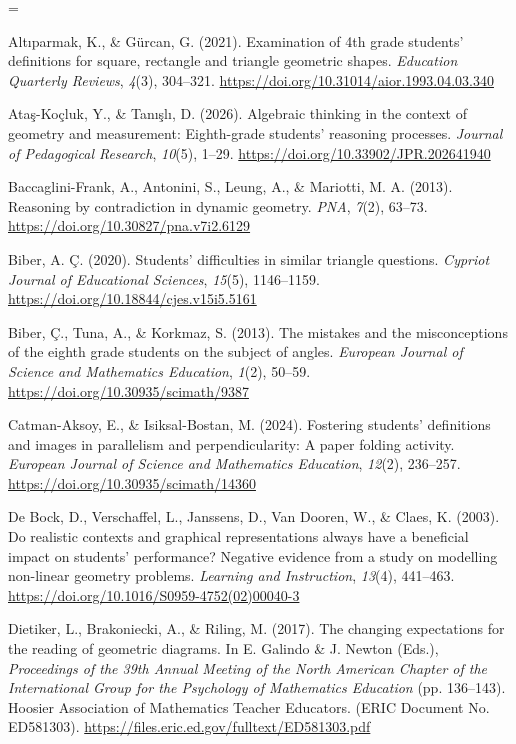 \documentclass[a4paper,12pt]{article}
\begin{document}
{\TimesEn\linespread{1.0}\selectfont\fontsize{10.0pt}{13.8pt}\selectfont
\setlength{\parskip}{2.2pt}
\everypar={\hangindent=0.85cm }

Altıparmak, K., \& Gürcan, G. (2021). Examination of 4th grade students' definitions for square, rectangle and triangle geometric shapes. \textit{Education Quarterly Reviews}, \textit{4}(3), 304--321. \url{https://doi.org/10.31014/aior.1993.04.03.340}

Ataş-Koçluk, Y., \& Tanışlı, D. (2026). Algebraic thinking in the context of geometry and measurement: Eighth-grade students' reasoning processes. \textit{Journal of Pedagogical Research}, \textit{10}(5), 1--29. \url{https://doi.org/10.33902/JPR.202641940}

Baccaglini-Frank, A., Antonini, S., Leung, A., \& Mariotti, M. A. (2013). Reasoning by contradiction in dynamic geometry. \textit{PNA}, \textit{7}(2), 63--73. \url{https://doi.org/10.30827/pna.v7i2.6129}

Biber, A. Ç. (2020). Students' difficulties in similar triangle questions. \textit{Cypriot Journal of Educational Sciences}, \textit{15}(5), 1146--1159. \url{https://doi.org/10.18844/cjes.v15i5.5161}

Biber, Ç., Tuna, A., \& Korkmaz, S. (2013). The mistakes and the misconceptions of the eighth grade students on the subject of angles. \textit{European Journal of Science and Mathematics Education}, \textit{1}(2), 50--59. \url{https://doi.org/10.30935/scimath/9387}

Catman-Aksoy, E., \& Isiksal-Bostan, M. (2024). Fostering students' definitions and images in parallelism and perpendicularity: A paper folding activity. \textit{European Journal of Science and Mathematics Education}, \textit{12}(2), 236--257. \url{https://doi.org/10.30935/scimath/14360}

De Bock, D., Verschaffel, L., Janssens, D., Van Dooren, W., \& Claes, K. (2003). Do realistic contexts and graphical representations always have a beneficial impact on students' performance? Negative evidence from a study on modelling non-linear geometry problems. \textit{Learning and Instruction}, \textit{13}(4), 441--463. \url{https://doi.org/10.1016/S0959-4752(02)00040-3}

Dietiker, L., Brakoniecki, A., \& Riling, M. (2017). The changing expectations for the reading of geometric diagrams. In E. Galindo \& J. Newton (Eds.), \textit{Proceedings of the 39th Annual Meeting of the North American Chapter of the International Group for the Psychology of Mathematics Education} (pp. 136--143). Hoosier Association of Mathematics Teacher Educators. (ERIC Document No. ED581303). \url{https://files.eric.ed.gov/fulltext/ED581303.pdf}

}
\end{document}
